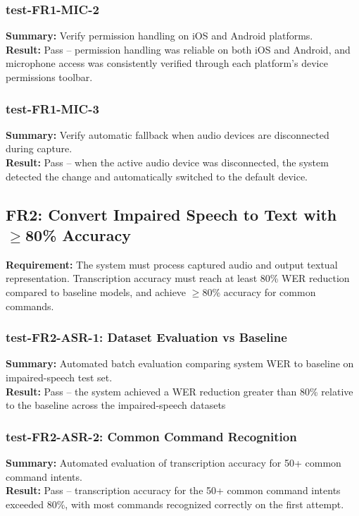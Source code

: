 \documentclass[12pt, titlepage]{article}
\begin{document}
\subsubsection{test-FR1-MIC-2}
\textbf{Summary:} Verify permission handling on iOS and Android platforms.\\
\textbf{Result:} Pass -- permission handling was reliable on both iOS and Android, and microphone access was consistently verified through each platform's device permissions toolbar.

\subsubsection{test-FR1-MIC-3}
\textbf{Summary:} Verify automatic fallback when audio devices are disconnected during capture.\\
\textbf{Result:} Pass -- when the active audio device was disconnected, the system detected the change and automatically switched to the default device.

\subsection{FR2: Convert Impaired Speech to Text with $\geq$80\% Accuracy}

\textbf{Requirement:} The system must process captured audio and output textual representation. Transcription accuracy must reach at least 80\% WER reduction compared to baseline models, and achieve $\geq$80\% accuracy for common commands.

\subsubsection{test-FR2-ASR-1: Dataset Evaluation vs Baseline}
\textbf{Summary:} Automated batch evaluation comparing system WER to baseline on impaired-speech test set.\\
\textbf{Result:} Pass -- the system achieved a WER reduction greater than 80\% relative to the baseline across the impaired-speech datasets

\subsubsection{test-FR2-ASR-2: Common Command Recognition}
\textbf{Summary:} Automated evaluation of transcription accuracy for 50+ common command intents.\\
\textbf{Result:} Pass -- transcription accuracy for the 50+ common command intents exceeded 80\%, with most commands recognized correctly on the first attempt.
\end{document}
